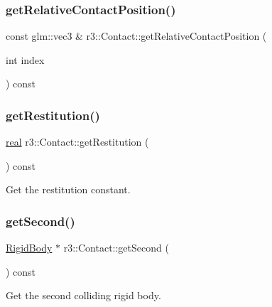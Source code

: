 \subsubsection{\texorpdfstring{get\+Relative\+Contact\+Position()}{getRelativeContactPosition()}}
{\footnotesize\ttfamily const glm\+::vec3 \& r3\+::\+Contact\+::get\+Relative\+Contact\+Position (\begin{DoxyParamCaption}\item[{int}]{index }\end{DoxyParamCaption}) const}

\mbox{\label{classr3_1_1_contact_a8ec701dcaf82e7fc65bc6c4a2cb6987e}} 
\subsubsection{\texorpdfstring{get\+Restitution()}{getRestitution()}}
{\footnotesize\ttfamily \mbox{\hyperlink{namespacer3_ab2016b3e3f743fb735afce242f0dc1eb}{real}} r3\+::\+Contact\+::get\+Restitution (\begin{DoxyParamCaption}{ }\end{DoxyParamCaption}) const}

Get the restitution constant. \mbox{\label{classr3_1_1_contact_a90af8f5c7cba65a6a84c57b5a6ef6d70}} 
\subsubsection{\texorpdfstring{get\+Second()}{getSecond()}}
{\footnotesize\ttfamily \mbox{\hyperlink{classr3_1_1_rigid_body}{Rigid\+Body}} $\ast$ r3\+::\+Contact\+::get\+Second (\begin{DoxyParamCaption}{ }\end{DoxyParamCaption}) const}

Get the second colliding rigid body. \mbox{\label{classr3_1_1_contact_af394998586bc05ec666ffbd06b0f7077}} 
